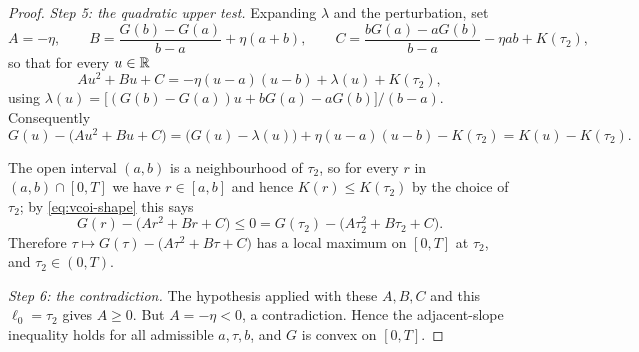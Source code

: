 \begin{proof}
\emph{Step 5: the quadratic upper test.}
Expanding $\lambda$ and the perturbation, set
\[
  A=-\eta,\qquad
  B=\frac{G(b)-G(a)}{b-a}+\eta(a+b),\qquad
  C=\frac{bG(a)-aG(b)}{b-a}-\eta ab+K(\tau_2),
\]
so that for every $u\in\mathbb{R}$
\[
  A u^2+Bu+C=-\eta(u-a)(u-b)+\lambda(u)+K(\tau_2),
\]
using $\lambda(u)=\bigl[(G(b)-G(a))u+bG(a)-aG(b)\bigr]/(b-a)$. Consequently
\begin{equation}\label{eq:vcoi-shape}
  G(u)-\bigl(Au^2+Bu+C\bigr)
   =\bigl(G(u)-\lambda(u)\bigr)+\eta(u-a)(u-b)-K(\tau_2)
   =K(u)-K(\tau_2).
\end{equation}

The open interval $(a,b)$ is a neighbourhood of $\tau_2$, so for every $r$ in
$(a,b)\cap[0,T]$ we have $r\in[a,b]$ and hence $K(r)\le K(\tau_2)$ by the choice of
$\tau_2$; by \eqref{eq:vcoi-shape} this says
\[
  G(r)-\bigl(Ar^2+Br+C\bigr)\le0=G(\tau_2)-\bigl(A\tau_2^2+B\tau_2+C\bigr).
\]
Therefore $\tau\mapsto G(\tau)-\bigl(A\tau^2+B\tau+C\bigr)$ has a local maximum on
$[0,T]$ at $\tau_2$, and $\tau_2\in(0,T)$.

\emph{Step 6: the contradiction.}
The hypothesis applied with these $A,B,C$ and this $\ell_0=\tau_2$ gives $A\ge0$. But
$A=-\eta<0$, a contradiction. Hence the adjacent-slope inequality holds for all
admissible $a,\tau,b$, and $G$ is convex on $[0,T]$.
\end{proof}
